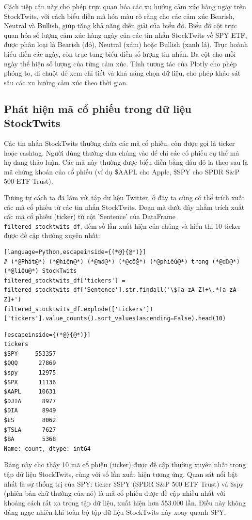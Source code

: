 Cách tiếp cận này cho phép trực quan hóa các xu hướng cảm xúc hàng ngày trên StockTwits, với cách biểu diễn mã hóa màu rõ ràng cho các cảm xúc Bearish, Neutral và Bullish, giúp tăng khả năng diễn giải của biểu đồ. Biểu đồ cột trực quan hóa số lượng cảm xúc hàng ngày của các tin nhắn StockTwits về SPY ETF, được phân loại là Bearish (đỏ), Neutral (xám) hoặc Bullish (xanh lá). Trục hoành biểu diễn các ngày, còn trục tung biểu diễn số lượng tin nhắn. Ba cột cho mỗi ngày thể hiện số lượng của từng cảm xúc. Tính tương tác của Plotly cho phép phóng to, di chuột để xem chi tiết và khả năng chọn dữ liệu, cho phép khảo sát sâu các xu hướng cảm xúc theo thời gian.

\subsection{Phát hiện mã cổ phiếu trong dữ liệu StockTwits}

Các tin nhắn StockTwits thường chứa các mã cổ phiếu, còn được gọi là ticker hoặc cashtag. Người dùng thường đưa chúng vào để chỉ các cổ phiếu cụ thể mà họ đang thảo luận. Các mã này thường được biểu diễn bằng dấu đô la theo sau là mã chứng khoán của cổ phiếu (ví dụ \$AAPL cho Apple, \$SPY cho SPDR S\&P 500 ETF Trust).

Tương tự cách ta đã làm với tập dữ liệu Twitter, ở đây ta cũng có thể trích xuất các mã cổ phiếu từ các tin nhắn StockTwits. Đoạn mã dưới đây nhằm trích xuất các mã cổ phiếu (ticker) từ cột 'Sentence' của DataFrame \texttt{filtered\_stocktwits\_df}, đếm số lần xuất hiện của chúng và hiển thị 10 ticker được đề cập thường xuyên nhất:

\begin{lstlisting}[language=Python,escapeinside={(*@}{@*)}]
# (*@Phát@*) (*@hiện@*) (*@mã@*) (*@cổ@*) (*@phiếu@*) trong (*@dữ@*) (*@liệu@*) StockTwits
filtered_stocktwits_df['tickers'] = filtered_stocktwits_df['Sentence'].str.findall('\$[a-zA-Z]+\.*[a-zA-Z]+')
filtered_stocktwits_df.explode(['tickers'])['tickers'].value_counts().sort_values(ascending=False).head(10)
\end{lstlisting}

\begin{lstlisting}[escapeinside={(*@}{@*)}]
tickers
$SPY     553357
$QQQ      27869
$spy      12975
$SPX      11136
$AAPL     10631
$DJIA      8977
$DIA       8949
$ES        8062
$TSLA      7627
$BA        5368
Name: count, dtype: int64
\end{lstlisting}

Bảng này cho thấy 10 mã cổ phiếu (ticker) được đề cập thường xuyên nhất trong tập dữ liệu StockTwits, cùng với số lần xuất hiện tương ứng. Quan sát nổi bật nhất là sự thống trị của SPY: ticker \$SPY (SPDR S\&P 500 ETF Trust) và \$spy (phiên bản chữ thường của nó) là mã cổ phiếu được đề cập nhiều nhất với khoảng cách rất xa trong tập dữ liệu, xuất hiện hơn 553.000 lần. Điều này không đáng ngạc nhiên khi toàn bộ tập dữ liệu StockTwits này xoay quanh SPY.

